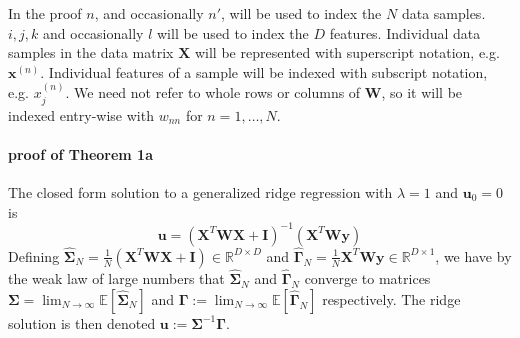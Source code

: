 \documentclass[mnsc,blindrev]{informs3}
\begin{document}
        In the proof $n$, and occasionally $n'$, will be used to index the $N$ data samples. $i,j,k$ and occasionally $l$ will be used to index the $D$ features. Individual data samples in the data matrix $\mathbf{X}$ will be represented with superscript notation, e.g. $\mathbf{x}^{(n)}$. Individual features of a sample will be indexed with subscript notation, e.g. $x^{(n)}_j$. We need not refer to whole rows or columns of $\mathbf{W}$, so it will be indexed entry-wise with $w_{nn}$ for $n=1,\ldots, N$.
    
    
        \paragraph{proof of Theorem 1a}
            The closed form solution to a generalized ridge regression with $\lambda = 1$ and $\mathbf{u}_0 = 0$ is
            \begin{equation*}
                \mathbf{u} = (\mathbf{X}^T \mathbf{W} \mathbf{X} + \mathbf{I})^{-1}(\mathbf{X}^T\mathbf{W}\mathbf{y})%
            \end{equation*}
                Defining $\hat{\mathbf{\Sigma}}_N = \frac{1}{N}(\mathbf{X}^T \mathbf{W} \mathbf{X} +  \mathbf{I}) \in \mathbb{R}^{D\times D}$ and $\hat{\mathbf{\Gamma}}_N = \frac{1}{N}\mathbf{X}^T \mathbf{W}\mathbf{y}\in \mathbb{R}^{D \times 1}$, we have by the weak law of large numbers that $\hat{\mathbf{\Sigma}}_N$ and  $\hat{\mathbf{\Gamma}}_N$ converge to matrices $\mathbf{\Sigma}=\lim_{N\rightarrow \infty} \mathds{E}[\hat{\mathbf{\Sigma}}_N]$ and $\mathbf{\Gamma}:=\lim_{N\rightarrow \infty} \mathds{E}[\hat{\mathbf{\Gamma}}_N]$ respectively.
                The ridge solution is then denoted $\mathbf{u} := \mathbf{\Sigma}^{-1}\mathbf{\Gamma}$. 
                
\end{document}
